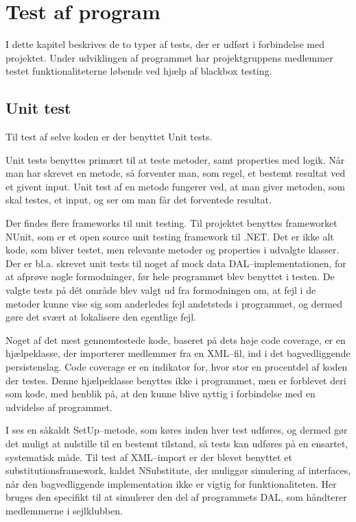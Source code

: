 \chapter{Test af program}\label{test_af_program}
I dette kapitel beskrives de to typer af tests, der er udført i forbindelse med projektet.
Under udviklingen af programmet har projektgruppens medlemmer testet funktionaliteterne løbende ved hjælp af blackbox testing.

\section{Unit test}
Til test af selve koden er der benyttet Unit tests.

Unit tests benyttes primært til at teste metoder, samt properties med logik.
Når man har skrevet en metode, så forventer man, som regel, et bestemt resultat ved et givent input.
Unit test af en metode fungerer ved, at man giver metoden, som skal testes, et input, og ser om man får det forventede resultat.

Der findes flere frameworks til unit testing.
Til projektet benyttes frameworket NUnit, som er et open source unit testing framework til .NET.
Det er ikke alt kode, som bliver testet, men relevante metoder og properties i udvalgte klasser.
Der er bl.a. skrevet unit tests til noget af mock data \ac{DAL}--implementationen, for at afprøve nogle formodninger, før hele programmet blev benyttet i testen.
De valgte tests på dét område blev valgt ud fra formodningen om, at fejl i de metoder kunne vise sig som anderledes fejl andetsteds i programmet, og dermed gøre det svært at lokalisere den egentlige fejl.

Noget af det mest gennemtestede kode, baseret på dets høje code coverage, er en hjælpeklasse, der importerer medlemmer fra en XML--fil, ind i det bagvedliggende persistenslag. 
Code coverage er en indikator for, hvor stor en procentdel af koden der testes.
Denne hjælpeklasse benyttes ikke i programmet, men er forblevet deri som kode, med henblik på, at den kunne blive nyttig i forbindelse med en udvidelse af programmet.

I  ses en såkaldt SetUp--metode, som køres inden hver test udføres, og dermed gør det muligt at nulstille til en bestemt tilstand, så tests kan udføres på en ensartet, systematisk måde.
Til test af XML--import er der blevet benyttet et substitutionsframework, kaldet NSubstitute, der muliggør simulering af interfaces, når den bagvedliggende implementation ikke er vigtig for funktionaliteten.
Her bruges den specifikt til at simulerer den del af programmets \ac{DAL}, som håndterer medlemmerne i sejlklubben.

